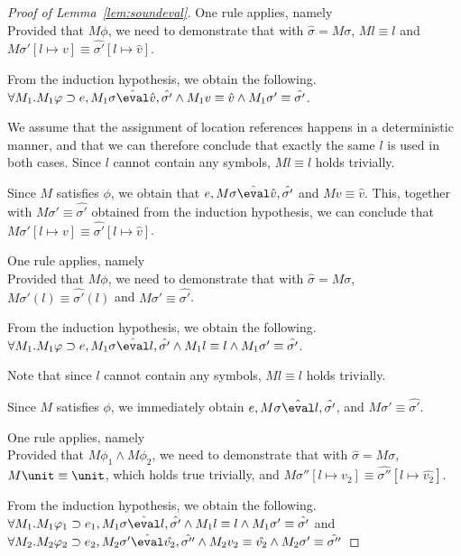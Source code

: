 \begin{proof}[Proof of Lemma~\ref{lem:soundeval}]
  {One rule applies, namely \\
  Provided that $M\phi$,
  we need to demonstrate that  with $\hat{\sigma}=M\sigma$,
  $M l \equiv l$ and $M\sigma'[l\mapsto v]\equiv\hat{\sigma'}[l\mapsto\hat{v}]$.

  From the induction hypothesis, we obtain the following.\\
  $\forall M_1 .  M_1\phi \implies e, M_1\sigma \hat{\eval}\hat{v},\hat{\sigma'}\land  M_1v\equiv \hat{v} \wedge  M_1\sigma'\equiv\hat{\sigma'}$.

  We assume that the assignment of location references happens in a deterministic manner, and that we can therefore conclude that exactly the same $l$ is used in both cases. Since $l$ cannot contain any symbols, $M l \equiv l$ holds trivially.

  Since $M$ satisfies $\phi$,
  we obtain that $e,M\sigma \hat{\eval}\hat{v},\hat{\sigma'}$ and $M v\equiv \hat{v}$.
  This, together with $M \sigma' \equiv\hat{\sigma'}$ obtained from the induction hypothesis, we can conclude that $M\sigma'[l\mapsto v]\equiv\hat{\sigma'}[l\mapsto\hat{v}]$.
  }

  {One rule applies, namely \\
  Provided that $M\phi$, we need to demonstrate that  with $\hat{\sigma}=M\sigma$,
  $M \sigma'(l) \equiv \hat{\sigma'}(l)$ and $M\sigma'\equiv\hat{\sigma'}$.

  From the induction hypothesis, we obtain the following.\\
  $\forall M_1 .  M_1\phi \implies e, M_1\sigma \hat{\eval}l,\hat{\sigma'}\land  M_1l\equiv l \land  M_1\sigma'\equiv\hat{\sigma'}$.

  Note that since $l$ cannot contain any symbols, $M l \equiv l$ holds trivially.

  Since $M$ satisfies $\phi$,
  we immediately obtain $e,M\sigma \hat{\eval}l,\hat{\sigma'}$,
  and $M\sigma'\equiv\hat{\sigma'}$.
}

  {
  One rule applies, namely \\
  Provided that $M\phi_1\wedge M\phi_2$,
  we need to demonstrate that  with $\hat{\sigma}=M\sigma$,
  $M\unit \equiv \unit$, which holds true trivially,
  and $M\sigma''[l\mapsto v_2]\equiv\hat{\sigma''}[l\mapsto\hat{v_2}]$.

  From the induction hypothesis, we obtain the following.\\
  $\forall M_1 .  M_1\phi_1 \implies e_1, M_1\sigma \hat{\eval}l,\hat{\sigma'}\land  M_1 l\equiv l \land  M_1\sigma'\equiv\hat{\sigma'}$ and\\
  $\forall M_2 . M_2\phi_2 \implies e_2,M_2\sigma' \hat{\eval}\hat{v_2},\hat{\sigma''}\land M_2v_2\equiv \hat{v_2} \land M_2\sigma'\equiv\hat{\sigma''}$

}
\end{proof}
